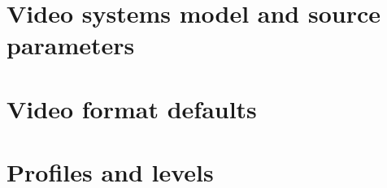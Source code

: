 \clearpage
\section{Video systems model and source parameters}


\clearpage
\section{Video format defaults}

\clearpage
\section{Profiles and levels}


